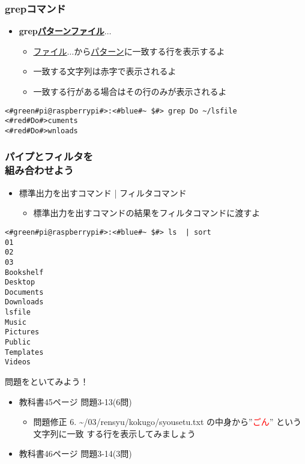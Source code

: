 \begin{frame}[fragile]
    \frametitle{grepコマンド}
    \begin{itemize}
        \item {\bf grep\textvisiblespace\underline{パターン}\textvisiblespace\underline{ファイル}$\ldots$}
        \begin{itemize}
            \small
            \item[] \underline{ファイル}$\ldots$から\underline{パターン}に一致する行を表示するよ
            \item[] 一致する文字列は赤字で表示されるよ
            \item[] 一致する行がある場合はその行のみが表示されるよ
        \end{itemize}
    \end{itemize}
    \begin{lstlisting}[title=grepコマンドの実行例, label=grep_example]
<#green#pi@raspberrypi#>:<#blue#~ $#> grep Do ~/lsfile
<#red#Do#>cuments
<#red#Do#>wnloads
    \end{lstlisting}
\end{frame}

\begin{frame}[fragile]
    \frametitle{パイプとフィルタを\\組み合わせよう}
    \vspace{1em}
    \begin{itemize}
        \item 標準出力を出すコマンド | フィルタコマンド
        \begin{itemize}
            \small
            \item[] 標準出力を出すコマンドの結果をフィルタコマンドに渡すよ
        \end{itemize}
    \end{itemize}
    \begin{lstlisting}[title=パイプラインを用いたsortコマンドの実行例, label=ppsort_example]
<#green#pi@raspberrypi#>:<#blue#~ $#> ls  | sort
01
02
03
Bookshelf
Desktop
Documents
Downloads
lsfile
Music
Pictures
Public
Templates
Videos
    \end{lstlisting}
\end{frame}

\begin{frame}
    \begin{exampleblock}{問題をといてみよう！}
        \begin{itemize}
            \item 教科書45ページ 問題3-13(6問)
            \begin{itemize}
                \item 問題修正 6. \textasciitilde/03/rensyu/kokugo/syousetu.txt の中身から”\textcolor{red}{ごん}” という文字列に一致
                する行を表示してみましょう
            \end{itemize}
            \item 教科書46ページ 問題3-14(3問)
        \end{itemize}
    \end{exampleblock} 
\end{frame}

